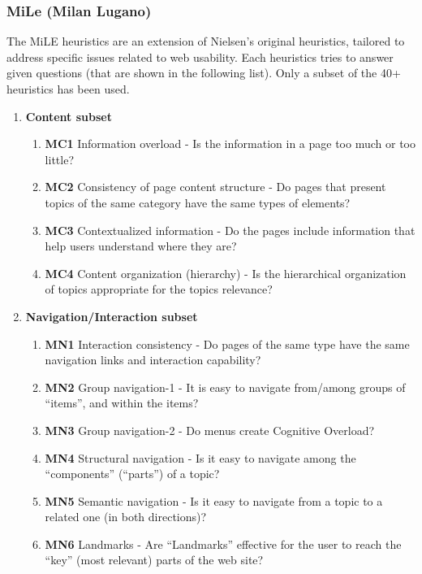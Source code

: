 \subsubsection{MiLe (Milan Lugano)}
The MiLE heuristics are an extension of Nielsen’s original heuristics, tailored to address specific issues related to web usability. Each heuristics tries to answer given questions (that are shown in the following list). Only a subset of the 40+ heuristics has been used.
\begin{enumerate}
	\item \textbf{Content subset}
		\begin{enumerate}
			\item \textbf{MC1} Information overload - Is the information in a page too much or too little?
			\item \textbf{MC2} Consistency of page content structure - Do pages that present topics of the same category have the same types of elements?
			\item \textbf{MC3} Contextualized information - Do the pages include information that help users understand where they are?
			\item \textbf{MC4} Content organization (hierarchy) - Is the hierarchical organization of topics appropriate for the topics relevance?
		\end{enumerate}

	\item \textbf{Navigation/Interaction subset}
		\begin{enumerate}
			\item \textbf{MN1} Interaction consistency - Do pages of the same type have the same navigation links and interaction capability?
			\item \textbf{MN2} Group navigation-1 - It is easy to navigate from/among groups of “items”, and within the items?
			\item \textbf{MN3} Group navigation-2 - Do menus create Cognitive Overload?
			\item \textbf{MN4} Structural navigation - Is it easy to navigate among the “components” (“parts”) of a topic?
			\item \textbf{MN5} Semantic navigation - Is it easy to navigate from a topic to a related one (in both directions)?
			\item \textbf{MN6} Landmarks - Are “Landmarks” effective for the user to reach the “key” (most relevant) parts of the web site?
		\end{enumerate}


\end{enumerate}
